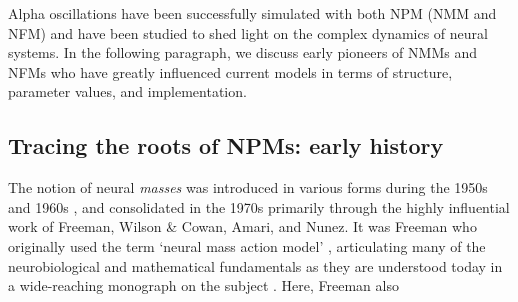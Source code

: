 \documentclass[12pt,twoside]{article}
\begin{document}
Alpha oscillations have been successfully simulated with both NPM (NMM and NFM) and have been studied to shed light on the complex dynamics of neural systems. In the following paragraph, we discuss early pioneers of NMMs and NFMs who have greatly influenced current models in terms of structure, parameter values, and implementation. 

\subsection{Tracing the roots of NPMs: early history}
The notion of neural \textit{masses} was introduced in various forms 
during the 1950s and 1960s \citep{beurle1956properties, griffith1963field}, and consolidated in the 1970s primarily through the highly influential work of Freeman, Wilson \& Cowan, Amari, and Nunez. It was Freeman who originally used the term `neural mass action model' \citep{freeman1972linear, freeman1972waves, freeman1975mass}, articulating many of the neurobiological and mathematical fundamentals as they are understood today in a wide-reaching monograph on the subject \citep{freeman1975mass}. Here, Freeman also %
\end{document}
